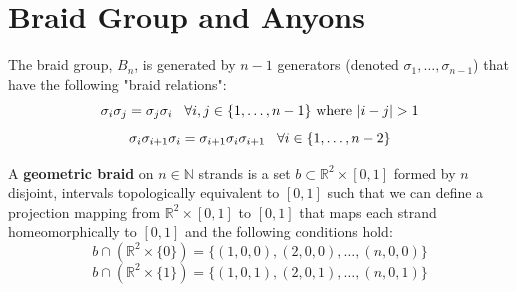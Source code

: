 \documentclass[compress,aspectratio=169,10pt,usenames,dvipsnames]{beamer}
\newcommand{\R}{\mathbb{R}}
\newcommand{\N}{\mathbb{N}}
\begin{document}
\section{Braid Group and Anyons}
\begin{frame}
\sectionpage
\end{frame}
%
%
\begin{frame}
\vfill
\begin{definition}
	The braid group, $B_n$, is generated by $n-1$ generators (denoted $\sigma_1,\hdots,\sigma_{n-1}$) that have the following "braid relations":
$$\sigma_i\sigma_j = \sigma_j\sigma_i \hspace{3mm} \forall i,j \in \{1,\hdots,n-1\} \text{ where } |i-j|>1$$
$$\sigma_i\sigma_{i+1}\sigma_i=\sigma_{i+1}\sigma_i\sigma_{i+1} \hspace{3mm} \forall i \in \{1,\hdots,n-2\}$$
\end{definition}
\vfill
\begin{definition}
	A \textbf{geometric braid} on $n\in \N$ strands is a set $b\subset\R^2\times [0,1]$ formed by $n$ disjoint, intervals topologically equivalent to $[0,1]$ such that we can define a projection mapping from $\R^2\times [0,1]$ to $[0,1]$ that maps each strand homeomorphically to $[0,1]$ and the following conditions hold:
$$b\cap(\R^2\times\{0\}) = \{(1,0,0),(2,0,0),\hdots,(n,0,0)\}$$
$$b\cap(\R^2\times\{1\}) = \{(1,0,1),(2,0,1),\hdots,(n,0,1)\}$$
\end{definition}
\vfill
\end{frame}
\end{document}

